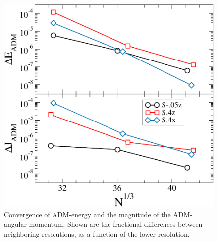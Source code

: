 \documentclass[aps,prd,amsmath,floatfix
,twocolumn
,superscriptaddress,nofootinbib,showpacs]{revtex4-1}
\theoremstyle{plain} \newtheorem{thm}{Theorem} \newtheorem{lem}{Lemma}
\newcommand{\red}[1]{\textcolor{Red}{#1}}
\newcommand{\roland}[1]{\textcolor{Magenta}{\textit{ROLAND: #1}}}
\begin{document}
\begin{figure}
\includegraphics[width=0.95\columnwidth]{EADMConvergence}
\caption{{\label{fig:EADMConvergence}} Convergence of ADM-energy and the magnitude of the ADM-angular momentum.  Shown are the fractional differences between neighboring resolutions, as a function of the lower resolution.
}
\end{figure}

\end{document}
